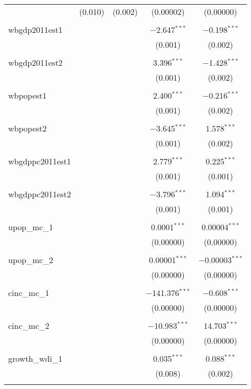 \begin{table}[!htbp]
\begin{tabular}{@{\extracolsep{5pt}}lcccc}
  & (0.010) & (0.002) & (0.00002) & (0.00000) \\ 
  & & & & \\ 
 wbgdp2011est1 &  &  & $-$2.647$^{***}$ & $-$0.198$^{***}$ \\ 
  &  &  & (0.001) & (0.002) \\ 
  & & & & \\ 
 wbgdp2011est2 &  &  & 3.396$^{***}$ & $-$1.428$^{***}$ \\ 
  &  &  & (0.001) & (0.002) \\ 
  & & & & \\ 
 wbpopest1 &  &  & 2.400$^{***}$ & $-$0.216$^{***}$ \\ 
  &  &  & (0.001) & (0.002) \\ 
  & & & & \\ 
 wbpopest2 &  &  & $-$3.645$^{***}$ & 1.578$^{***}$ \\ 
  &  &  & (0.001) & (0.002) \\ 
  & & & & \\ 
 wbgdppc2011est1 &  &  & 2.779$^{***}$ & 0.225$^{***}$ \\ 
  &  &  & (0.001) & (0.001) \\ 
  & & & & \\ 
 wbgdppc2011est2 &  &  & $-$3.796$^{***}$ & 1.094$^{***}$ \\ 
  &  &  & (0.001) & (0.001) \\ 
  & & & & \\ 
 upop\_mc\_1 &  &  & 0.0001$^{***}$ & 0.00004$^{***}$ \\ 
  &  &  & (0.00000) & (0.00000) \\ 
  & & & & \\ 
 upop\_mc\_2 &  &  & 0.00001$^{***}$ & $-$0.00003$^{***}$ \\ 
  &  &  & (0.00000) & (0.00000) \\ 
  & & & & \\ 
 cinc\_mc\_1 &  &  & $-$141.376$^{***}$ & $-$0.608$^{***}$ \\ 
  &  &  & (0.00000) & (0.00000) \\ 
  & & & & \\ 
 cinc\_mc\_2 &  &  & $-$10.983$^{***}$ & 14.703$^{***}$ \\ 
  &  &  & (0.00000) & (0.00000) \\ 
  & & & & \\ 
 growth\_wdi\_1 &  &  & 0.035$^{***}$ & 0.088$^{***}$ \\ 
  &  &  & (0.008) & (0.002) \\ 
  & & & & \\ 

\end{tabular}
\end{table}
